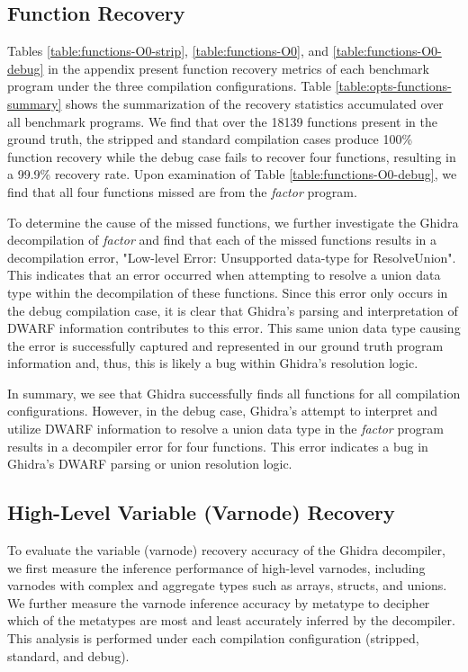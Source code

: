 \documentclass[conference]{IEEEtran}
\begin{document}
\subsection{Function Recovery}



Tables \ref{table:functions-O0-strip}, \ref{table:functions-O0}, and \ref{table:functions-O0-debug} in the appendix present function recovery metrics of each benchmark program under the three compilation configurations. Table \ref{table:opts-functions-summary} shows the summarization of the recovery statistics accumulated over all benchmark programs. We find that over the 18139 functions present in the ground truth, the stripped and standard compilation cases produce 100\% function recovery while the debug case fails to recover four functions, resulting in a 99.9\% recovery rate. Upon examination of Table \ref{table:functions-O0-debug}, we find that all four functions missed are from the \emph{factor} program.

To determine the cause of the missed functions, we further investigate the Ghidra decompilation of \emph{factor} and find that each of the missed functions results in a decompilation error, "Low-level Error: Unsupported data-type for ResolveUnion". This indicates that an error occurred when attempting to resolve a union data type within the decompilation of these functions. Since this error only occurs in the debug compilation case, it is clear that Ghidra's parsing and interpretation of DWARF information contributes to this error. This same union data type causing the error is successfully captured and represented in our ground truth program information and, thus, this is likely a bug within Ghidra's resolution logic.

In summary, we see that Ghidra successfully finds all functions for all compilation configurations. However, in the debug case, Ghidra's attempt to interpret and utilize DWARF information to resolve a union data type in the \emph{factor} program results in a decompiler error for four functions. This error indicates a bug in Ghidra's DWARF parsing or union resolution logic.

\subsection{High-Level Variable (Varnode) Recovery}

To evaluate the variable (varnode) recovery accuracy of the Ghidra decompiler, we first measure the inference performance of high-level varnodes, including varnodes with complex and aggregate types such as arrays, structs, and unions. We further measure the varnode inference accuracy by metatype to decipher which of the metatypes are most and least accurately inferred by the decompiler. This analysis is performed under each compilation configuration (stripped, standard, and debug).
\end{document}
